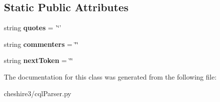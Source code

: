 \subsection*{Static Public Attributes}
\begin{DoxyCompactItemize}
\item 
\hypertarget{classcheshire3_1_1cql_parser_1_1_c_q_lshlex_a30e7b02539d2f00c10f899c9b389306c}{string {\bfseries quotes} = '\char`\"{}'}\label{classcheshire3_1_1cql_parser_1_1_c_q_lshlex_a30e7b02539d2f00c10f899c9b389306c}

\item 
\hypertarget{classcheshire3_1_1cql_parser_1_1_c_q_lshlex_a11bfd3b4a2c8cc51dc60c9e7123e5b4d}{string {\bfseries commenters} = \char`\"{}\char`\"{}}\label{classcheshire3_1_1cql_parser_1_1_c_q_lshlex_a11bfd3b4a2c8cc51dc60c9e7123e5b4d}

\item 
\hypertarget{classcheshire3_1_1cql_parser_1_1_c_q_lshlex_a400b93663283575116fbf258cb2e78a2}{string {\bfseries next\-Token} = \char`\"{}\char`\"{}}\label{classcheshire3_1_1cql_parser_1_1_c_q_lshlex_a400b93663283575116fbf258cb2e78a2}

\end{DoxyCompactItemize}


The documentation for this class was generated from the following file\-:\begin{DoxyCompactItemize}
\item 
cheshire3/cql\-Parser.\-py\end{DoxyCompactItemize}
